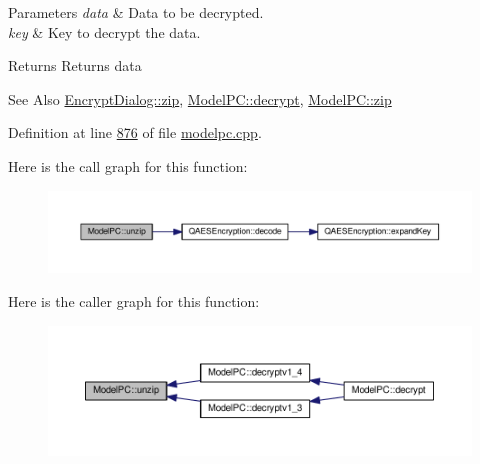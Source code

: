 \begin{DoxyParams}{Parameters}
{\em data} & Data to be decrypted. \\
\hline
{\em key} & Key to decrypt the data. \\
\hline
\end{DoxyParams}
\begin{DoxyReturn}{Returns}
Returns data 
\end{DoxyReturn}
\begin{DoxySeeAlso}{See Also}
\hyperlink{class_encrypt_dialog_a2bff820a3df4ddc36ecb07ed74b7138a}{Encrypt\-Dialog\-::zip}, \hyperlink{class_model_p_c_a5995215a34a1e1f504035715a8013809}{Model\-P\-C\-::decrypt}, \hyperlink{class_model_p_c_afebbbfa4b07deba4f68fc6dfb50f353f}{Model\-P\-C\-::zip} 
\end{DoxySeeAlso}


Definition at line \hyperlink{modelpc_8cpp_source_l00876}{876} of file \hyperlink{modelpc_8cpp_source}{modelpc.\-cpp}.



Here is the call graph for this function\-:
\nopagebreak
\begin{figure}[H]
\begin{center}
\leavevmode
\includegraphics[width=350pt]{class_model_p_c_a6da88f166785a49f73b22c169f956fd0_cgraph}
\end{center}
\end{figure}




Here is the caller graph for this function\-:
\nopagebreak
\begin{figure}[H]
\begin{center}
\leavevmode
\includegraphics[width=350pt]{class_model_p_c_a6da88f166785a49f73b22c169f956fd0_icgraph}
\end{center}
\end{figure}


